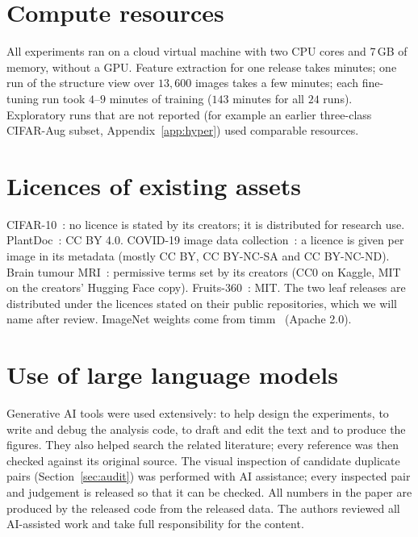 \section{Compute resources}
\label{app:compute}

All experiments ran on a cloud virtual machine with two CPU cores and 7\,GB of memory, without a GPU. Feature extraction for one release takes minutes; one run of the structure view over $13{,}600$ images takes a few minutes; each fine-tuning run took $4$--$9$ minutes of training ($143$ minutes for all $24$ runs). Exploratory runs that are not reported (for example an earlier three-class CIFAR-Aug subset, Appendix~\ref{app:hyper}) used comparable resources.

\section{Licences of existing assets}
\label{app:licences}

CIFAR-10~\citep{krizhevsky2009cifar}: no licence is stated by its creators; it is distributed for research use. PlantDoc~\citep{singh2020plantdoc}: CC BY 4.0. COVID-19 image data collection~\citep{cohen2020covid}: a licence is given per image in its metadata (mostly CC BY, CC BY-NC-SA and CC BY-NC-ND). Brain tumour MRI~\citep{bhuvaji2020brain}: permissive terms set by its creators (CC0 on Kaggle, MIT on the creators' Hugging Face copy). Fruits-360~\citep{muresan2018fruits}: MIT. The two leaf releases are distributed under the licences stated on their public repositories, which we will name after review. ImageNet weights come from timm~\citep{wightman2019timm} (Apache 2.0).

\section{Use of large language models}
\label{app:llm}

Generative AI tools were used extensively: to help design the experiments, to write and debug the analysis code, to draft and edit the text and to produce the figures. They also helped search the related literature; every reference was then checked against its original source. The visual inspection of candidate duplicate pairs (Section~\ref{sec:audit}) was performed with AI assistance; every inspected pair and judgement is released so that it can be checked. All numbers in the paper are produced by the released code from the released data. The authors reviewed all AI-assisted work and take full responsibility for the content.
